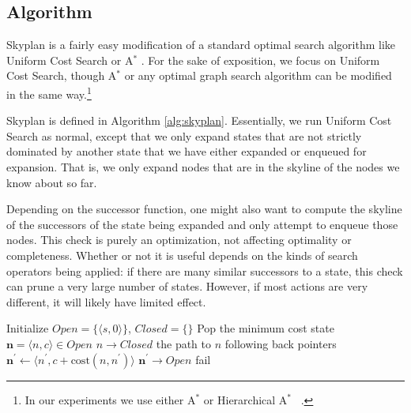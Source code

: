 \documentclass[letterpaper]{article}
\theoremstyle{plain} \newtheorem{theorem}{Theorem} \newtheorem{proposition}{Proposition} \newtheorem{lemma}{Lemma}
\theoremstyle{definition} \newtheorem{definition}{Definition} \newtheorem{conjecture}{Conjecture} \newtheorem*{example}{Example}
\theoremstyle{remark} \newtheorem*{remark}{Remark} \newtheorem*{note}{Note} \newtheorem{case}{Case}
\newcommand{\Astar}{A$^*$ }
\begin{document}
\subsection{Algorithm}

Skyplan is a fairly easy modification of a standard
optimal search algorithm like Uniform Cost Search or \Astar. For
the sake of exposition, we focus on Uniform Cost Search, though
\Astar or any optimal graph search algorithm can be modified in the
same way.\footnote{In our experiments we use either \Astar or
Hierarchical \Astar~\citep{holte1996hierarchical}.}

Skyplan is defined in Algorithm \ref{alg:skyplan}. Essentially, we
run Uniform Cost Search as normal, except that we only expand states
that are not strictly dominated by another state that we have either
expanded or enqueued for expansion. That is, we only expand nodes
that are in the skyline of the nodes we know about so far.

Depending on the successor function, one might also want to compute
the skyline of the successors of the state being expanded and only
attempt to enqueue those nodes.  This check is purely an optimization,
not affecting optimality or completeness. Whether or not it is
useful depends on the kinds of search operators being applied: if
there are many similar successors to a state, this check can prune a very large
number of states. However, if most actions are very different, it will
likely have limited effect.

\begin{algorithm}
  \begin{algorithmic}[1]
    \State Initialize $\textit{Open}=\{\langle s,0\rangle\}$, $\textit{Closed}=\{\}$
    \State Pop the minimum cost state $\mathbf{n} = \langle n,c\rangle\in \textit{Open}$
    \State $n\rightarrow \textit{Closed}$
        \State \Return the path to $n$ following back pointers
      \EndIf
        \State $\mathbf{n^\prime} \gets \langle n^\prime,c+\mathrm{cost}(n,n^\prime)\rangle$
        \State $\mathbf{n^\prime} \rightarrow \textit{Open}$
        \EndFor
      \EndIf
    \EndWhile
    \State fail
  \EndProcedure
  \end{algorithmic}
\caption{A version of Skyplan based on uniform cost search.  }
\label{alg:skyplan}
\end{algorithm}
\end{document}

